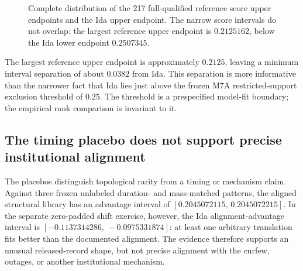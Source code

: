 \documentclass[11pt]{article}
\begin{document}
\begin{figure}[t]
\centering
{}
\caption{Complete distribution of the 217 full-qualified reference score upper endpoints and the Ida upper endpoint. The narrow score intervals do not overlap: the largest reference upper endpoint is $0.2125162$, below the Ida lower endpoint $0.2507345$.}
\label{fig:rank}
\end{figure}

The largest reference upper endpoint is approximately $0.2125$, leaving a minimum interval separation of about $0.0382$ from Ida. This separation is more informative than the narrower fact that Ida lies just above the frozen M7A restricted-support exclusion threshold of $0.25$. The threshold is a prespecified model-fit boundary; the empirical rank comparison is invariant to it.

\subsection{The timing placebo does not support precise institutional alignment}

The placebos distinguish topological rarity from a timing or mechanism claim. Against three frozen unlabeled duration- and mass-matched patterns, the aligned structural library has an advantage interval of $[0.2045072115,\,0.2045072215]$. In the separate zero-padded shift exercise, however, the Ida alignment-advantage interval is $[-0.1137314286,\,-0.0975331874]$: at least one arbitrary translation fits better than the documented alignment. The evidence therefore supports an unusual released-record shape, but not precise alignment with the curfew, outages, or another institutional mechanism.
\end{document}
